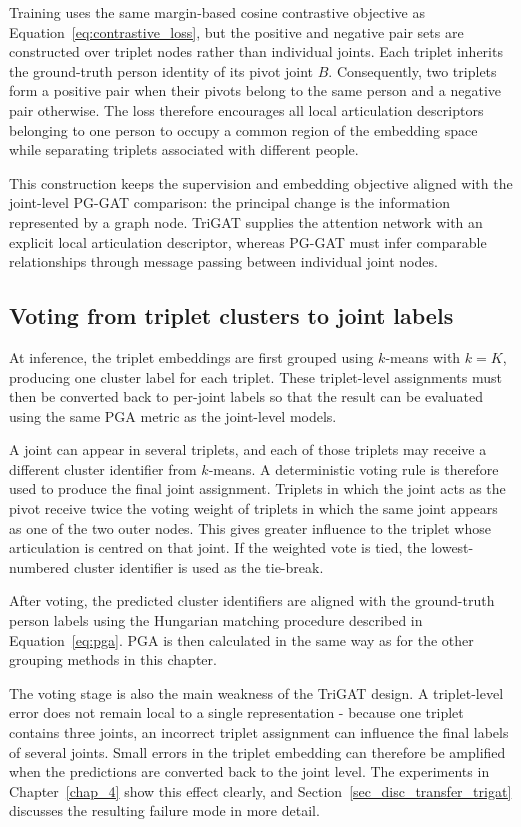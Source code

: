 Training uses the same margin-based cosine contrastive objective as
Equation~\eqref{eq:contrastive_loss}, but the positive and negative
pair sets are constructed over triplet nodes rather than individual
joints. Each triplet inherits the ground-truth person identity of its
pivot joint $B$. Consequently, two triplets form a positive pair when
their pivots belong to the same person and a negative pair otherwise.
The loss therefore encourages all local articulation descriptors
belonging to one person to occupy a common region of the embedding
space while separating triplets associated with different people.

This construction keeps the supervision and embedding objective
aligned with the joint-level PG-GAT comparison: the principal change
is the information represented by a graph node. TriGAT supplies the
attention network with an explicit local articulation descriptor,
whereas PG-GAT must infer comparable relationships through message
passing between individual joint nodes.

\subsection{Voting from triplet clusters to joint labels}
\label{sec_meth_trigat_voting}

At inference, the triplet embeddings are first grouped using
$k$-means with $k=K$,
producing one cluster label for each triplet.
These triplet-level assignments must then be converted back to
per-joint labels
so that the result can be evaluated using the same PGA metric
as the joint-level models.

A joint can appear in several triplets,
and each of those triplets may receive a different cluster identifier
from $k$-means.
A deterministic voting rule is therefore used to produce
the final joint assignment.
Triplets in which the joint acts as the pivot receive twice the voting
weight of triplets in which the same joint appears as one of the two
outer nodes.
This gives greater influence to the triplet whose articulation
is centred on that joint.
If the weighted vote is tied,
the lowest-numbered cluster identifier is used
as the tie-break.

After voting,
the predicted cluster identifiers are aligned with the
ground-truth person labels using the Hungarian matching procedure
described in Equation~\eqref{eq:pga}.
PGA is then calculated in the same way as for the other grouping methods
in this chapter.

The voting stage is also the main weakness of the TriGAT design.
A triplet-level error does not remain local to a single representation -
because one triplet contains three joints,
an incorrect triplet assignment can influence the final labels
of several joints.
Small errors in the triplet embedding can therefore be amplified
when the predictions are converted back to the joint level.
The experiments in Chapter~\ref{chap_4} show this effect clearly,
and Section~\ref{sec_disc_transfer_trigat} discusses the resulting
failure mode in more detail.

